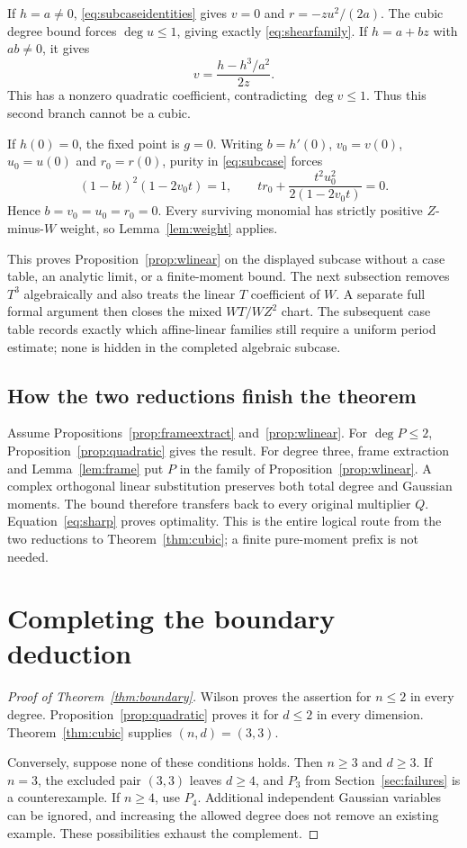 \documentclass[11pt]{article}
\theoremstyle{definition}\newtheorem{definition}[theorem]{Definition}
\theoremstyle{remark}\newtheorem{remark}[theorem]{Remark}
\begin{document}
If $h=a\ne0$, \eqref{eq:subcaseidentities} gives $v=0$ and
$r=-zu^2/(2a)$. The cubic degree bound forces $\deg u\leq1$, giving
exactly \eqref{eq:shearfamily}. If $h=a+bz$ with $ab\ne0$, it gives
\[
 v=\frac{h-h^3/a^2}{2z}.
\]
This has a nonzero quadratic coefficient, contradicting $\deg v\leq1$.
Thus this second branch cannot be a cubic.

If $h(0)=0$, the fixed point is $g=0$. Writing
$b=h'(0)$, $v_0=v(0)$, $u_0=u(0)$ and $r_0=r(0)$, purity in
\eqref{eq:subcase} forces
\[
 (1-bt)^2(1-2v_0t)=1,\qquad
 tr_0+\frac{t^2u_0^2}{2(1-2v_0t)}=0.
\]
Hence $b=v_0=u_0=r_0=0$. Every surviving monomial has strictly positive
$Z$-minus-$W$ weight, so Lemma~\ref{lem:weight} applies.

This proves Proposition~\ref{prop:wlinear} on the displayed subcase
without a case table, an analytic limit, or a finite-moment bound.
The next subsection removes $T^3$ algebraically and also treats the
linear $T$ coefficient of $W$. A separate full formal argument then
closes the mixed $WT/WZ^2$ chart. The subsequent case table records
exactly which affine-linear families still require a uniform period
estimate; none is hidden in the completed algebraic subcase.





\subsection{How the two reductions finish the theorem}
Assume Propositions~\ref{prop:frameextract} and~\ref{prop:wlinear}.
For $\deg P\leq2$, Proposition~\ref{prop:quadratic} gives the result.
For degree three, frame extraction and Lemma~\ref{lem:frame} put $P$
in the family of Proposition~\ref{prop:wlinear}. A complex orthogonal
linear substitution preserves both total degree and Gaussian moments.
The bound therefore transfers back to every original multiplier $Q$.
Equation~\eqref{eq:sharp} proves optimality. This is the entire logical
route from the two reductions to Theorem~\ref{thm:cubic}; a finite
pure-moment prefix is not needed.

\section{Completing the boundary deduction}
\begin{proof}[Proof of Theorem~\ref{thm:boundary}]
Wilson proves the assertion for $n\leq2$ in every degree.
Proposition~\ref{prop:quadratic} proves it for $d\leq2$ in every
dimension. Theorem~\ref{thm:cubic} supplies $(n,d)=(3,3)$.

Conversely, suppose none of these conditions holds. Then $n\geq3$
and $d\geq3$. If $n=3$, the excluded pair $(3,3)$ leaves $d\geq4$,
and $P_3$ from Section~\ref{sec:failures} is a counterexample.
If $n\geq4$, use $P_4$. Additional independent Gaussian variables can
be ignored, and increasing the allowed degree does not remove an
existing example. These possibilities exhaust the complement.
\end{proof}
\end{document}
